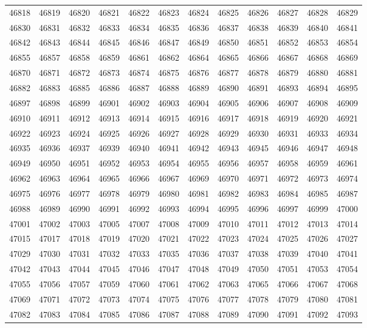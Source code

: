 \begin{center}
\begin{longtable}{llllllllllll}
46818 &46819 &46820 &46821 &46822 &46823 &46824 &46825 &46826 &46827 &46828 &46829 \\
46830 &46831 &46832 &46833 &46834 &46835 &46836 &46837 &46838 &46839 &46840 &46841 \\
46842 &46843 &46844 &46845 &46846 &46847 &46849 &46850 &46851 &46852 &46853 &46854 \\
46855 &46857 &46858 &46859 &46861 &46862 &46864 &46865 &46866 &46867 &46868 &46869 \\
46870 &46871 &46872 &46873 &46874 &46875 &46876 &46877 &46878 &46879 &46880 &46881 \\
46882 &46883 &46885 &46886 &46887 &46888 &46889 &46890 &46891 &46893 &46894 &46895 \\
46897 &46898 &46899 &46901 &46902 &46903 &46904 &46905 &46906 &46907 &46908 &46909 \\
46910 &46911 &46912 &46913 &46914 &46915 &46916 &46917 &46918 &46919 &46920 &46921 \\
46922 &46923 &46924 &46925 &46926 &46927 &46928 &46929 &46930 &46931 &46933 &46934 \\
46935 &46936 &46937 &46939 &46940 &46941 &46942 &46943 &46945 &46946 &46947 &46948 \\
46949 &46950 &46951 &46952 &46953 &46954 &46955 &46956 &46957 &46958 &46959 &46961 \\
46962 &46963 &46964 &46965 &46966 &46967 &46969 &46970 &46971 &46972 &46973 &46974 \\
46975 &46976 &46977 &46978 &46979 &46980 &46981 &46982 &46983 &46984 &46985 &46987 \\
46988 &46989 &46990 &46991 &46992 &46993 &46994 &46995 &46996 &46997 &46999 &47000 \\
47001 &47002 &47003 &47005 &47007 &47008 &47009 &47010 &47011 &47012 &47013 &47014 \\
47015 &47017 &47018 &47019 &47020 &47021 &47022 &47023 &47024 &47025 &47026 &47027 \\
47029 &47030 &47031 &47032 &47033 &47035 &47036 &47037 &47038 &47039 &47040 &47041 \\
47042 &47043 &47044 &47045 &47046 &47047 &47048 &47049 &47050 &47051 &47053 &47054 \\
47055 &47056 &47057 &47059 &47060 &47061 &47062 &47063 &47065 &47066 &47067 &47068 \\
47069 &47071 &47072 &47073 &47074 &47075 &47076 &47077 &47078 &47079 &47080 &47081 \\
47082 &47083 &47084 &47085 &47086 &47087 &47088 &47089 &47090 &47091 &47092 &47093 \\

\end{longtable}
\end{center}
